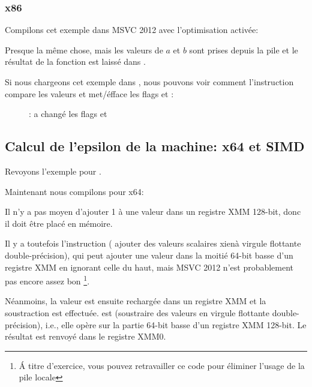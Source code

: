 \clearpage
\subsubsection{x86}

Compilons cet exemple dans MSVC 2012 avec l'optimisation activée:



Presque la même chose, mais les valeurs de $a$ et $b$ sont prises depuis la pile
et le résultat de la fonction est laissé dans .

Si nous chargeons cet exemple dans \olly, nous pouvons voir comment l'instruction
 compare les valeurs et met/éfface les flags \CF et \PF:

\begin{figure}[H]
\centering
{}
\caption{\olly:  a changé les flags \CF et \PF}
\label{fig:FPU_SIMD_d_max_olly}
\end{figure}

\subsection{Calcul de l'epsilon de la machine: x64 et SIMD}
\label{machine_epsilon_x64_and_SIMD}

Revoyons l'exemple  pour \Tdouble {}.

Maintenant nous compilons pour x64:



Il n'y a pas moyen d'ajouter 1 à une valeur dans un registre XMM 128-bit, donc il
doit être placé en mémoire.

Il y a toutefois l'instruction  ( ajouter des valeurs scalaires xienà virgule flottante double-précision), qui
peut ajouter une valeur dans la moitié 64-bit basse d'un registre XMM en ignorant
celle du haut, mais MSVC 2012 n'est probablement pas encore assez bon \footnote{Á
titre d'exercice, vous pouvez retravailler ce code pour éliminer l'usage de la pile
locale}.

Néanmoins, la valeur est ensuite rechargée dans un registre XMM et la soustraction
est effectuée.
 est  (soustraire
des valeurs en virgule flottante double-précision), i.e., elle opère sur la partie
64-bit basse d'un registre XMM 128-bit.
Le résultat est renvoyé dans le registre XMM0.

